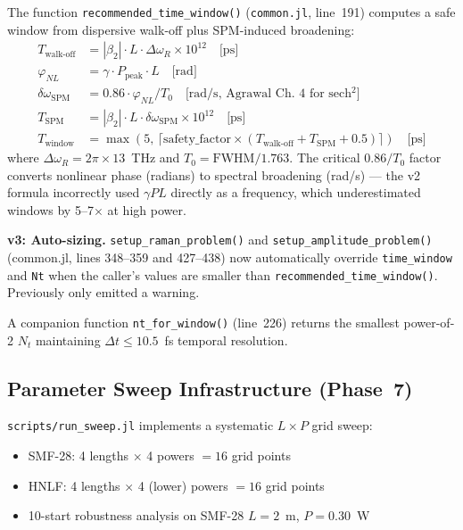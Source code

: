 \documentclass[12pt,a4paper]{article}
\theoremstyle{definition}
\begin{document}
The function \texttt{recommended\_time\_window()} (\texttt{common.jl}, line~191) computes a safe window from dispersive walk-off plus SPM-induced broadening:
\begin{align}
T_{\text{walk-off}} &= |\beta_2| \cdot L \cdot \Delta\omega_R \times 10^{12} \quad\text{[ps]} \\
\varphi_{NL} &= \gamma \cdot P_{\text{peak}} \cdot L \quad\text{[rad]} \\
\delta\omega_{\text{SPM}} &= 0.86 \cdot \varphi_{NL} / T_0 \quad\text{[rad/s, Agrawal Ch.~4 for sech$^2$]} \\
T_{\text{SPM}} &= |\beta_2| \cdot L \cdot \delta\omega_{\text{SPM}} \times 10^{12} \quad\text{[ps]} \\
T_{\text{window}} &= \max\!\left(5,\, \lceil \text{safety\_factor} \times (T_{\text{walk-off}} + T_{\text{SPM}} + 0.5) \rceil\right) \quad\text{[ps]}
\end{align}
where $\Delta\omega_R = 2\pi \times 13$~THz and $T_0 = \text{FWHM}/1.763$. The critical $0.86/T_0$ factor converts nonlinear phase (radians) to spectral broadening (rad/s) --- the v2 formula incorrectly used $\gamma P L$ directly as a frequency, which underestimated windows by 5--7$\times$ at high power.

\begin{advisory}
\textbf{v3: Auto-sizing.} \texttt{setup\_raman\_problem()} and \texttt{setup\_amplitude\_problem()} (common.jl, lines 348--359 and 427--438) now automatically override \texttt{time\_window} and \texttt{Nt} when the caller's values are smaller than \texttt{recommended\_time\_window()}. Previously only emitted a warning.
\end{advisory}

A companion function \texttt{nt\_for\_window()} (line~226) returns the smallest power-of-2 $N_t$ maintaining $\Delta t \leq 10.5$~fs temporal resolution.

\subsection{Parameter Sweep Infrastructure (Phase~7)}

\texttt{scripts/run\_sweep.jl} implements a systematic $L \times P$ grid sweep:
\begin{itemize}[leftmargin=*]
\item SMF-28: 4 lengths $\times$ 4 powers $= 16$ grid points
\item HNLF: 4 lengths $\times$ 4 (lower) powers $= 16$ grid points
\item 10-start robustness analysis on SMF-28 $L=2$~m, $P=0.30$~W
\end{itemize}
\end{document}
